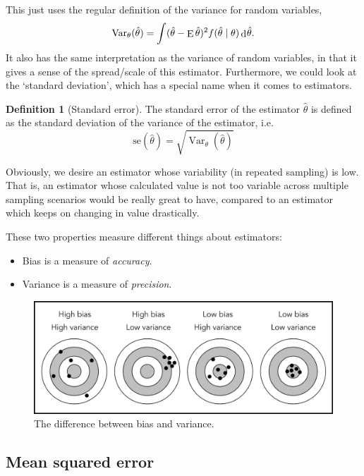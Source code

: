 \documentclass[
]{book}
\providecommand{\tightlist}{%
  \setlength{\itemsep}{0pt}\setlength{\parskip}{0pt}}
\DeclareMathOperator{\E}{E}
\DeclareMathOperator{\Var}{Var}
\DeclareMathOperator{\dd}{d}
\newcommand{\dint}{\dd\hspace{0.5pt}\!}
\theoremstyle{definition}
\newtheorem{definition}{Definition}[chapter]
\theoremstyle{definition}
\theoremstyle{definition}
\theoremstyle{definition}
\theoremstyle{remark}
\begin{document}
This just uses the regular definition of the variance for random variables,
\[
{\Var}_\theta(\hat\theta) = \int (\hat\theta-\E\hat\theta)^2 f(\hat\theta\mid\theta) \dint \hat\theta.
\]
It also has the same interpretation as the variance of random variables, in that it gives a sense of the spread/scale of this estimator.
Furthermore, we could look at the `standard deviation', which has a special name when it comes to estimators.

\begin{definition}[Standard error]
The standard error of the estimator \(\hat\theta\) is defined as the standard deviation of the variance of the estimator, i.e.
\[\text{se}(\hat\theta) = \sqrt{\Var_\theta(\hat\theta)}\]
\end{definition}

Obviously, we desire an estimator whose variability (in repeated sampling) is low.
That is, an estimator whose calculated value is not too variable across multiple sampling scenarios would be really great to have, compared to an estimator which keeps on changing in value drastically.

These two properties measure different things about estimators:

\begin{itemize}
\tightlist
\item
  Bias is a measure of \emph{accuracy}.
\item
  Variance is a measure of \emph{precision}.
\end{itemize}

\begin{figure}

{\centering \includegraphics[width=0.8\linewidth]{figure/biasvariance1} 

}

\caption{The difference between bias and variance.}\label{fig:biasvariance}
\end{figure}

\hypertarget{mean-squared-error}{%
\subsection{Mean squared error}\label{mean-squared-error}}
\end{document}
